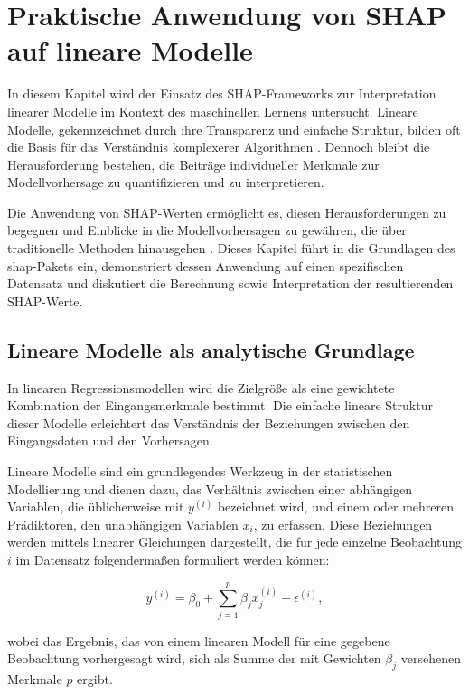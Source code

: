 \chapter{Praktische Anwendung von SHAP auf lineare Modelle}

In diesem Kapitel wird der Einsatz des SHAP-Frameworks zur Interpretation linearer Modelle im 
Kontext des maschinellen Lernens untersucht. Lineare Modelle, gekennzeichnet durch ihre Transparenz 
und einfache Struktur, bilden oft die Basis für das Verständnis komplexerer Algorithmen \cite[S. 37]{Molnar_2022}. 
Dennoch bleibt die Herausforderung bestehen, die Beiträge individueller Merkmale zur Modellvorhersage zu 
quantifizieren und zu interpretieren.

Die Anwendung von SHAP-Werten ermöglicht es, diesen Herausforderungen zu begegnen und Einblicke in 
die Modellvorhersagen zu gewähren, die über traditionelle Methoden hinausgehen \cite[S. 224]{Molnar_2022}. 
Dieses Kapitel führt in die Grundlagen des \textsf{shap}-Pakets ein, demonstriert dessen Anwendung auf einen 
spezifischen Datensatz und diskutiert die Berechnung sowie Interpretation der resultierenden SHAP-Werte.

\section{Lineare Modelle als analytische Grundlage}

In linearen Regressionsmodellen wird die Zielgröße als eine gewichtete Kombination der Eingangsmerkmale bestimmt. 
Die einfache lineare Struktur dieser Modelle erleichtert das Verständnis der Beziehungen zwischen den Eingangsdaten 
und den Vorhersagen. 

Lineare Modelle sind ein grundlegendes Werkzeug in der statistischen Modellierung und dienen dazu, das Verhältnis zwischen 
einer abhängigen Variablen, die üblicherweise mit $y^{(i)}$ bezeichnet wird, 
und einem oder mehreren Prädiktoren, den unabhängigen Variablen $x_i$, zu erfassen. 
Diese Beziehungen werden mittels linearer Gleichungen dargestellt, die für jede 
einzelne Beobachtung $i$ im Datensatz folgendermaßen formuliert werden können:

\begin{equation}
    y^{(i)} = \beta_0 + \sum_{j=1}^{p} \beta_j x^{(i)}_j + \epsilon^{(i)},
\label{eq:reg-model}
\end{equation}

wobei das Ergebnis, das von einem linearen Modell für eine gegebene Beobachtung vorhergesagt wird, sich als Summe der mit 
Gewichten $\beta_j$ versehenen Merkmale $p$ ergibt.

